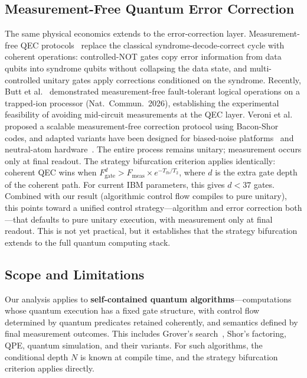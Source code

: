\documentclass[11pt]{article}
\begin{document}
\subsection{Measurement-Free Quantum Error Correction}

The same physical economics extends to the error-correction layer.
Measurement-free QEC protocols~\cite{barrett2010fault,paetznick2013,chamberland2022cat} replace the classical syndrome-decode-correct cycle with coherent operations: controlled-NOT gates copy error information from data qubits into syndrome qubits without collapsing the data state, and multi-controlled unitary gates apply corrections conditioned on the syndrome.
Recently, Butt et al.~\cite{butt2026} demonstrated measurement-free fault-tolerant logical operations on a trapped-ion processor (Nat.\ Commun.\ 2026), establishing the experimental feasibility of avoiding mid-circuit measurements at the QEC layer.
Veroni et al.~\cite{veroni2025} proposed a scalable measurement-free correction protocol using Bacon-Shor codes, and adapted variants have been designed for biased-noise platforms~\cite{mfnbiased2025} and neutral-atom hardware~\cite{locher2026}.
The entire process remains unitary; measurement occurs only at final readout.
The strategy bifurcation criterion applies identically: coherent QEC wins when $F_\text{gate}^{d} > F_\text{meas} \times e^{-T_\text{fb}/T_2}$, where $d$ is the extra gate depth of the coherent path.
For current IBM parameters, this gives $d < 37$ gates.
Combined with our result (algorithmic control flow compiles to pure unitary), this points toward a unified control strategy---algorithm and error correction both---that defaults to pure unitary execution, with measurement only at final readout.
This is not yet practical, but it establishes that the strategy bifurcation extends to the full quantum computing stack.

\subsection{Scope and Limitations}

Our analysis applies to \textbf{self-contained quantum algorithms}---computations whose quantum execution has a fixed gate structure, with control flow determined by quantum predicates retained coherently, and semantics defined by final measurement outcomes.
This includes Grover's search~\cite{grover1996}, Shor's factoring, QPE, quantum simulation, and their variants.
For such algorithms, the conditional depth $N$ is known at compile time, and the strategy bifurcation criterion applies directly.
\end{document}
